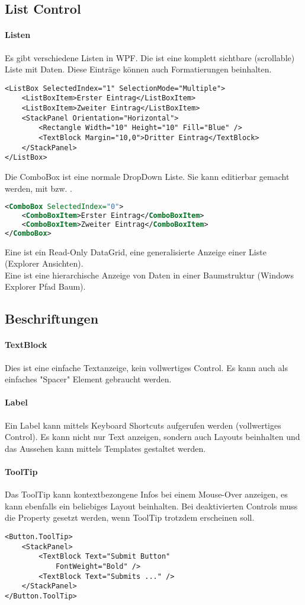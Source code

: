 \subsection{List Control}
\paragraph{Listen} Es gibt verschiedene Listen in WPF. Die  ist eine komplett sichtbare (scrollable) Liste mit Daten. Diese Einträge können auch Formatierungen beinhalten.
\begin{lstlisting}
<ListBox SelectedIndex="1" SelectionMode="Multiple">
    <ListBoxItem>Erster Eintrag</ListBoxItem>
    <ListBoxItem>Zweiter Eintrag</ListBoxItem>
    <StackPanel Orientation="Horizontal">
        <Rectangle Width="10" Height="10" Fill="Blue" />
        <TextBlock Margin="10,0">Dritter Eintrag</TextBlock>
    </StackPanel>
</ListBox>
\end{lstlisting}
Die ComboBox ist eine normale DropDown Liste. Sie kann editierbar gemacht werden, mit  bzw. .
\begin{lstlisting}[language=xml]
<ComboBox SelectedIndex="0">
    <ComboBoxItem>Erster Eintrag</ComboBoxItem>
    <ComboBoxItem>Zweiter Eintrag</ComboBoxItem>
</ComboBox>
\end{lstlisting}
Eine  ist ein Read-Only DataGrid, eine generalisierte Anzeige einer Liste (Explorer Ansichten).\\
Eine  ist eine hierarchische Anzeige von Daten in einer Baumstruktur (Windows Explorer Pfad Baum).
\subsection{Beschriftungen} 
\paragraph{TextBlock} Dies ist eine einfache Textanzeige, kein vollwertiges Control. Es kann auch als einfaches "{}Spacer"{} Element gebraucht werden.
\paragraph{Label} Ein Label kann mittels Keyboard Shortcuts aufgerufen werden (vollwertiges Control). Es kann nicht nur Text anzeigen, sondern auch Layouts beinhalten und das Aussehen kann mittels Templates gestaltet werden.
\paragraph{ToolTip} Das ToolTip kann kontextbezongene Infos bei einem Mouse-Over anzeigen, es kann ebenfalls ein beliebiges Layout beinhalten. Bei deaktivierten Controls muss die Property  gesetzt werden, wenn ToolTip trotzdem erscheinen soll.
\begin{lstlisting}
<Button.ToolTip>
    <StackPanel>
        <TextBlock Text="Submit Button"
            FontWeight="Bold" />
        <TextBlock Text="Submits ..." />
    </StackPanel>
</Button.ToolTip>
\end{lstlisting}

